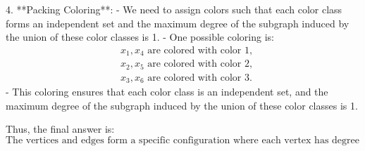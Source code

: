 4. **Packing Coloring**:
   - We need to assign colors such that each color class forms an independent set and the maximum degree of the subgraph induced by the union of these color classes is 1.
   - One possible coloring is:
     \[
     \begin{aligned}
     &x_1, x_4 \text{ are colored with color } 1, \\
     &x_2, x_5 \text{ are colored with color } 2, \\
     &x_3, x_6 \text{ are colored with color } 3.
     \end{aligned}
     \]
   - This coloring ensures that each color class is an independent set, and the maximum degree of the subgraph induced by the union of these color classes is 1.

Thus, the final answer is:
\[
\boxed{\text{The vertices and edges form a specific configuration where each vertex has degree 3 and the distance between any two vertices is at most 2, and the graph can be packed with 3 colors such that each color class is an independent set.}}
\]